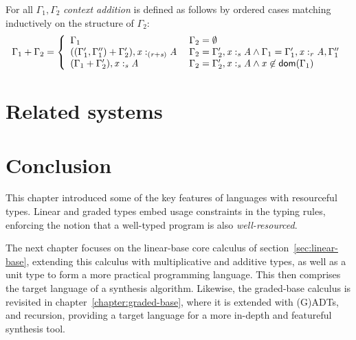 \begin{definition}\label{def:contextAdd}
  For all $\Gamma_{{\mathrm{1}}}, \Gamma_{{\mathrm{2}}}$
  \emph{context addition} is defined
as follows by ordered cases matching inductively on the structure of
$\Gamma_{{\mathrm{2}}}$:
\begin{align*}
\Gamma_{{\mathrm{1}}}  \GRANULEsym{+}  \Gamma_{{\mathrm{2}}} = \left\{\begin{matrix}
    \begin{array}{ll}
    \Gamma_{{\mathrm{1}}} &
    \Gamma_{{\mathrm{2}}} = \emptyset
             \\
      ((\Gamma'_{{\mathrm{1}}}, \Gamma''_{{\mathrm{1}}}) + \Gamma'_{{\mathrm{2}}}), \GRANULEmv{x}  :_{\textcolor{coeffectColor}{  \GRANULEsym{(}  \GRANULEnt{r}  \GRANULEsym{+}  \GRANULEnt{s}  \GRANULEsym{)}  } }   \GRANULEnt{A} \; &
\Gamma_{{\mathrm{2}}} = \Gamma'_{{\mathrm{2}}}  \GRANULEsym{,}   \GRANULEmv{x}  :_{\textcolor{coeffectColor}{  \GRANULEnt{s}  } }   \GRANULEnt{A} \wedge \Gamma_{{\mathrm{1}}} = \Gamma'_{{\mathrm{1}}}  \GRANULEsym{,}   \GRANULEmv{x}  :_{\textcolor{coeffectColor}{  \GRANULEnt{r}  } }   \GRANULEnt{A},\Gamma''_{{\mathrm{1}}} \\
 \GRANULEsym{(}  \Gamma_{{\mathrm{1}}}  \GRANULEsym{+}  \Gamma'_{{\mathrm{2}}}  \GRANULEsym{)}  \GRANULEsym{,}   \GRANULEmv{x}  :_{\textcolor{coeffectColor}{  \GRANULEnt{s}  } }   \GRANULEnt{A} & \Gamma_{{\mathrm{2}}} = \Gamma'_{{\mathrm{2}}}  \GRANULEsym{,}   \GRANULEmv{x}  :_{\textcolor{coeffectColor}{  \GRANULEnt{s}  } }   \GRANULEnt{A} \wedge \GRANULEmv{x} \not\in \mathsf{dom}(\Gamma_{{\mathrm{1}}})
\end{array}
  \end{matrix}\right.
\end{align*}
\end{definition}


\section{Related systems}

\section{Conclusion}
This chapter introduced some of the key features of languages with resourceful
types. Linear and graded types embed usage constraints in the typing rules,
enforcing the notion that a well-typed program is also \textit{well-resourced}.


The next chapter focuses on the linear-base core calculus of
section~\ref{sec:linear-base}, extending this calculus with multiplicative and additive
types, as well as a unit type to form a more practical programming language. This
then comprises the target language of a synthesis algorithm. Likewise, the graded-base
calculus is revisited in chapter~\ref{chapter:graded-base}, where it is extended
with (G)ADTs, and recursion, providing a target language for a more in-depth and
featureful synthesis tool.
